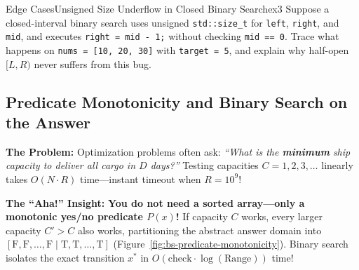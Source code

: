 \documentclass[11pt,a4paper]{article}
\theoremstyle{definition}
\newcommand{\painbeat}{\textbf{\color{accentamber}The Problem:} }
\newcommand{\ahabeat}{\textbf{\color{accentteal}The ``Aha!'' Insight:} }
\begin{document}
\begin{tryitbox}{Edge Cases}{Unsigned Size Underflow in Closed Binary Search}{ex3}
Suppose a closed-interval binary search uses unsigned \texttt{std::size\_t} for \texttt{left}, \texttt{right}, and \texttt{mid}, and executes \texttt{right = mid - 1;} without checking \texttt{mid == 0}. Trace what happens on \texttt{nums = [10, 20, 30]} with \texttt{target = 5}, and explain why half-open $[L, R)$ never suffers from this bug.
\end{tryitbox}

\subsection{Predicate Monotonicity and Binary Search on the Answer}

\painbeat Optimization problems often ask: \emph{``What is the \textbf{minimum} ship capacity to deliver all cargo in $D$ days?''} Testing capacities $C = 1, 2, 3, \dots$ linearly takes $O(N \cdot R)$ time---instant timeout when $R = 10^9$!

\ahabeat \textbf{You do not need a sorted array---only a monotonic yes/no predicate $P(x)$!} If capacity $C$ works, every larger capacity $C' > C$ also works, partitioning the abstract answer domain into $[\text{F}, \text{F}, \dots, \text{F} \mid \text{T}, \text{T}, \dots, \text{T}]$ (Figure~\ref{fig:bs-predicate-monotonicity}). Binary search isolates the exact transition $x^*$ in $O(\text{check} \cdot \log(\text{Range}))$ time!
\end{document}
